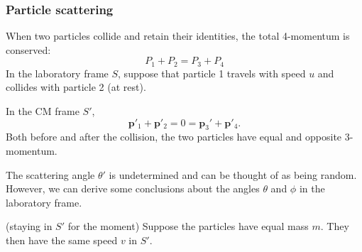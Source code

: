\documentclass[a4paper]{article}
\begin{document}
\subsubsection*{Particle scattering}
When two particles collide and retain their identities, the total 4-momentum is conserved:
\[
  P_1 + P_2 = P_3 + P_4
\]
In the laboratory frame $S$, suppose that particle 1 travels with speed $u$ and collides with particle 2 (at rest).
\begin{center}
\end{center}
In the CM frame $S'$,
\[
  \mathbf{p}'_1 + \mathbf{p}'_2 = 0 = \mathbf{p}_3' + \mathbf{p}'_4.
\]
Both before and after the collision, the two particles have equal and opposite 3-momentum.
\begin{center}
\end{center}
The scattering angle $\theta'$ is undetermined and can be thought of as being random. However, we can derive some conclusions about the angles $\theta$ and $\phi$ in the laboratory frame.

(staying in $S'$ for the moment) Suppose the particles have equal mass $m$. They then have the same speed $v$ in $S'$.
\end{document}
